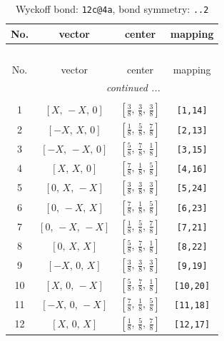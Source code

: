\documentclass[fleqn,8pt]{jsarticle}
\begin{document}
\renewcommand{\arraystretch}{1.2}
\begin{longtable}{cccc}
\caption{Wyckoff bond: {\tt 12c@4a}, bond symmetry: {\tt ..2}}
 \\
 \hline \hline
No. & vector & center & mapping \\ \hline \endfirsthead

\multicolumn{3}{l}{\tablename\ \thetable{}} \\
 \hline \hline
No. & vector & center & mapping \\ \hline \endhead

 \hline \hline
\multicolumn{3}{r}{\footnotesize\it continued ...} \\ \endfoot

 \hline \hline
\multicolumn{3}{r}{} \\ \endlastfoot

1 & $\left[ X,\, - X,\, 0 \right]$ & $\left[ \frac{3}{8},\, \frac{3}{8},\, \frac{3}{8} \right]$ & {\tt [1,14]} \\ \hline
2 & $\left[ - X,\, X,\, 0 \right]$ & $\left[ \frac{1}{8},\, \frac{5}{8},\, \frac{7}{8} \right]$ & {\tt [2,13]} \\ \hline
3 & $\left[ - X,\, - X,\, 0 \right]$ & $\left[ \frac{5}{8},\, \frac{7}{8},\, \frac{1}{8} \right]$ & {\tt [3,15]} \\ \hline
4 & $\left[ X,\, X,\, 0 \right]$ & $\left[ \frac{7}{8},\, \frac{1}{8},\, \frac{5}{8} \right]$ & {\tt [4,16]} \\ \hline
5 & $\left[ 0,\, X,\, - X \right]$ & $\left[ \frac{3}{8},\, \frac{3}{8},\, \frac{3}{8} \right]$ & {\tt [5,24]} \\ \hline
6 & $\left[ 0,\, - X,\, X \right]$ & $\left[ \frac{7}{8},\, \frac{1}{8},\, \frac{5}{8} \right]$ & {\tt [6,23]} \\ \hline
7 & $\left[ 0,\, - X,\, - X \right]$ & $\left[ \frac{1}{8},\, \frac{5}{8},\, \frac{7}{8} \right]$ & {\tt [7,21]} \\ \hline
8 & $\left[ 0,\, X,\, X \right]$ & $\left[ \frac{5}{8},\, \frac{7}{8},\, \frac{1}{8} \right]$ & {\tt [8,22]} \\ \hline
9 & $\left[ - X,\, 0,\, X \right]$ & $\left[ \frac{3}{8},\, \frac{3}{8},\, \frac{3}{8} \right]$ & {\tt [9,19]} \\ \hline
10 & $\left[ X,\, 0,\, - X \right]$ & $\left[ \frac{5}{8},\, \frac{7}{8},\, \frac{1}{8} \right]$ & {\tt [10,20]} \\ \hline
11 & $\left[ - X,\, 0,\, - X \right]$ & $\left[ \frac{7}{8},\, \frac{1}{8},\, \frac{5}{8} \right]$ & {\tt [11,18]} \\ \hline
12 & $\left[ X,\, 0,\, X \right]$ & $\left[ \frac{1}{8},\, \frac{5}{8},\, \frac{7}{8} \right]$ & {\tt [12,17]} \\
\end{longtable}
\end{document}
